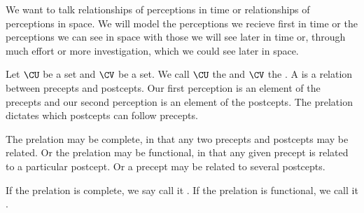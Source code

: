

We want to talk relationships
of perceptions in time or
relationships of perceptions in
space.
We will model the perceptions
we recieve first in time or the
perceptions we can see in space
with those we will see later in
time or, through much effort
or more investigation, which we
could see later in space.


Let $\CU$ be a set
and $\CV$ be a set.
We call $\CU$ the
and $\CV$ the .
A  is
a relation between precepts
and postcepts.
Our first perception is an
element of the precepts and
our second perception is an
element of the postcepts.
The prelation dictates which
postcepts can follow precepts.


The prelation may be
complete, in that any two precepts
and postcepts may be related.
Or the prelation may
be functional, in that any given
precept is related to a particular
postcept.
Or a precept may be related
to several postcepts.

If the prelation is complete, we say
call it .
If the prelation is functional, we call
it .
